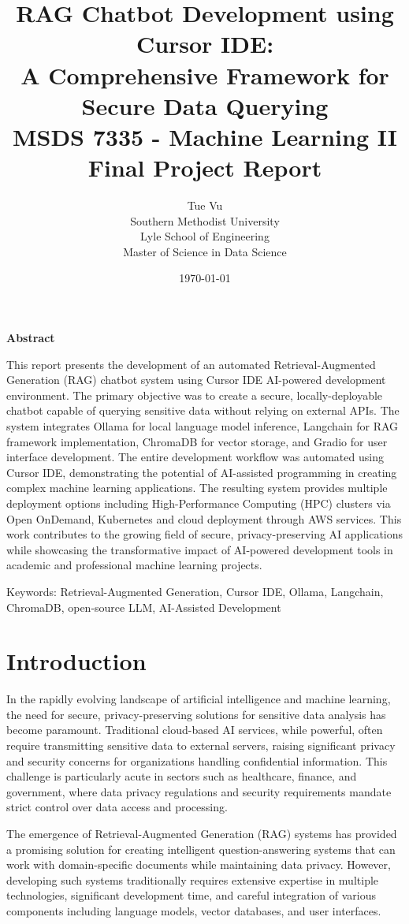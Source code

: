 \documentclass[12pt,letterpaper]{article}
\title{
    \vspace{2in}
    \textbf{\Automated RAG Chatbot Development using Cursor IDE:\\
    A Comprehensive Framework for Secure Data Querying} \\
    \vspace{0.5in}
    \large MSDS 7335 - Machine Learning II \\
    Final Project Report \\
    \vspace{0.5in}
}
\author{
    Tue Vu \\
    Southern Methodist University \\
    Lyle School of Engineering \\
    Master of Science in Data Science \\
    \vspace{0.25in}
}
\date{\today}
\begin{document}
\maketitle
\newpage

\textbf{Abstract}

This report presents the development of an automated Retrieval-Augmented Generation (RAG) chatbot system using Cursor IDE AI-powered development environment. The primary objective was to create a secure, locally-deployable chatbot capable of querying sensitive data without relying on external APIs. The system integrates Ollama for local language model inference, Langchain for RAG framework implementation, ChromaDB for vector storage, and Gradio for user interface development. The entire development workflow was automated using Cursor IDE, demonstrating the potential of AI-assisted programming in creating complex machine learning applications. The resulting system provides multiple deployment options including High-Performance Computing (HPC) clusters via Open OnDemand, Kubernetes and cloud deployment through AWS services.
This work contributes to the growing field of secure, privacy-preserving AI applications while showcasing the transformative impact of AI-powered development tools in academic and professional machine learning projects.

Keywords: Retrieval-Augmented Generation, Cursor IDE, Ollama, Langchain, ChromaDB, open-source LLM, AI-Assisted Development

\newpage

\section{Introduction}

In the rapidly evolving landscape of artificial intelligence and machine learning, the need for secure, privacy-preserving solutions for sensitive data analysis has become paramount. Traditional cloud-based AI services, while powerful, often require transmitting sensitive data to external servers, raising significant privacy and security concerns for organizations handling confidential information. This challenge is particularly acute in sectors such as healthcare, finance, and government, where data privacy regulations and security requirements mandate strict control over data access and processing.

The emergence of Retrieval-Augmented Generation (RAG) systems has provided a promising solution for creating intelligent question-answering systems that can work with domain-specific documents while maintaining data privacy. However, developing such systems traditionally requires extensive expertise in multiple technologies, significant development time, and careful integration of various components including language models, vector databases, and user interfaces.
\end{document}
